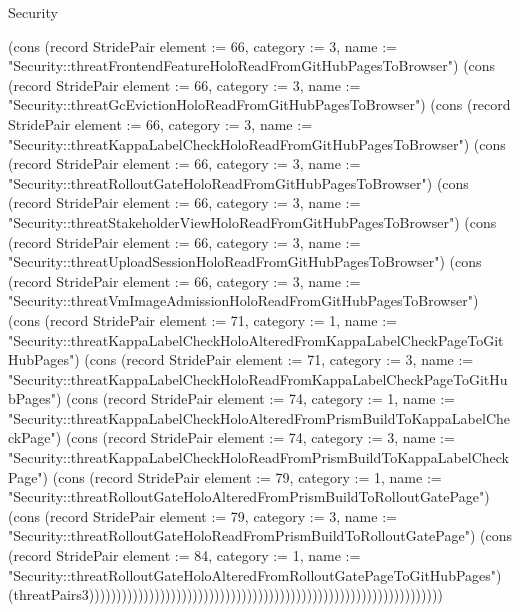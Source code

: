 \begin{lexlean}{Security}
\begin{semanticmodule}
{(cons (record StridePair {element := 66, category := 3, name := "Security::threatFrontendFeatureHoloReadFromGitHubPagesToBrowser"}) (cons (record StridePair {element := 66, category := 3, name := "Security::threatGcEvictionHoloReadFromGitHubPagesToBrowser"}) (cons (record StridePair {element := 66, category := 3, name := "Security::threatKappaLabelCheckHoloReadFromGitHubPagesToBrowser"}) (cons (record StridePair {element := 66, category := 3, name := "Security::threatRolloutGateHoloReadFromGitHubPagesToBrowser"}) (cons (record StridePair {element := 66, category := 3, name := "Security::threatStakeholderViewHoloReadFromGitHubPagesToBrowser"}) (cons (record StridePair {element := 66, category := 3, name := "Security::threatUploadSessionHoloReadFromGitHubPagesToBrowser"}) (cons (record StridePair {element := 66, category := 3, name := "Security::threatVmImageAdmissionHoloReadFromGitHubPagesToBrowser"}) (cons (record StridePair {element := 71, category := 1, name := "Security::threatKappaLabelCheckHoloAlteredFromKappaLabelCheckPageToGitHubPages"}) (cons (record StridePair {element := 71, category := 3, name := "Security::threatKappaLabelCheckHoloReadFromKappaLabelCheckPageToGitHubPages"}) (cons (record StridePair {element := 74, category := 1, name := "Security::threatKappaLabelCheckHoloAlteredFromPrismBuildToKappaLabelCheckPage"}) (cons (record StridePair {element := 74, category := 3, name := "Security::threatKappaLabelCheckHoloReadFromPrismBuildToKappaLabelCheckPage"}) (cons (record StridePair {element := 79, category := 1, name := "Security::threatRolloutGateHoloAlteredFromPrismBuildToRolloutGatePage"}) (cons (record StridePair {element := 79, category := 3, name := "Security::threatRolloutGateHoloReadFromPrismBuildToRolloutGatePage"}) (cons (record StridePair {element := 84, category := 1, name := "Security::threatRolloutGateHoloAlteredFromRolloutGatePageToGitHubPages"}) (threatPairs3)))))))))))))))))))))))))))))))))))))))))))))))))))))))))))))))))
}


\end{semanticmodule}
\end{lexlean}
